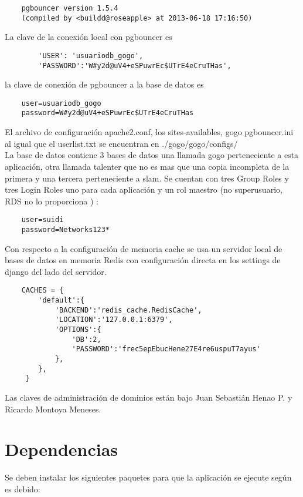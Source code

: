 \documentclass[10pt,a4paper]{book}
\begin{document}
	\begin{verbatim}
	pgbouncer version 1.5.4
	(compiled by <buildd@roseapple> at 2013-06-18 17:16:50)
	\end{verbatim}

	La clave de la conexión local con pgbouncer es
	\begin{verbatim}
		'USER': 'usuariodb_gogo',
		'PASSWORD':'W#y2d@uV4+eSPuwrEc$UTrE4eCruTHas',
	\end{verbatim}

	la clave de conexión de pgbouncer a la base de datos es
	\begin{verbatim}
	user=usuariodb_gogo
	password=W#y2d@uV4+eSPuwrEc$UTrE4eCruTHas
	\end{verbatim}

	El archivo de configuración apache2.conf, los sites-availables, gogo pgbouncer.ini al igual que el userlist.txt se encuentran en ./gogo/gogo/configs/ \\

	La base de datos contiene 3 bases de datos una llamada gogo perteneciente a esta aplicación, otra llamada talenter que no es mas que una copia incompleta de la primera y una tercera perteneciente a slam. Se cuentan con tres Group Roles y tres Login Roles uno para cada aplicación y un rol maestro (no superusuario, RDS no lo proporciona ) :
	\begin{verbatim}
	user=suidi
	password=Networks123*
	\end{verbatim}
	
	Con respecto a la configuración de memoria cache se usa un servidor local de bases de datos en memoria Redis con configuración directa en los settings de django del lado del servidor.
	
	\begin{verbatim}
	CACHES = {
	  	'default':{
	  		'BACKEND':'redis_cache.RedisCache',
	  		'LOCATION':'127.0.0.1:6379',
	  		'OPTIONS':{
	  			'DB':2,
	  			'PASSWORD':'frec5epEbucHene27E4re6uspuT7ayus'
	  		},
	  	},
	 }
	\end{verbatim}
	

	Las claves de administración de dominios están bajo Juan Sebastián Henao P. y Ricardo Montoya Meneses.

	\section{Dependencias}

	Se deben instalar los siguientes paquetes para que la aplicación se ejecute según es debido:
\end{document}
